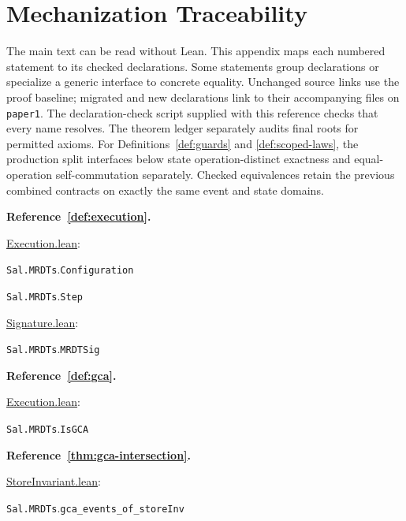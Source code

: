 \section{Mechanization Traceability}
\label{app:traceability}
The main text can be read without Lean. This appendix maps each numbered
statement to its checked declarations. Some statements group declarations
or specialize a generic interface to concrete equality. Unchanged source
links use the proof baseline; migrated and new declarations link to their
accompanying files on \texttt{paper1}. The declaration-check
script supplied with this reference checks that every name resolves.
The theorem ledger separately audits final roots for permitted axioms.
For Definitions~\ref{def:guards} and \ref{def:scoped-laws}, the
production split interfaces below state operation-distinct exactness and
equal-operation self-commutation separately. Checked equivalences retain
the previous combined contracts on exactly the same event and state domains.

\medskip\noindent\textbf{Reference~\ref{def:execution}.}\par\nobreak
\noindent\href{https://github.com/fplaunchpad/sal/blob/07fe525/Sal/MRDTs/Framework/Execution.lean}{Execution.lean}:\par
{\small\nolinkurl{Sal.MRDTs}.\allowbreak\nolinkurl{Configuration}}\par
{\small\nolinkurl{Sal.MRDTs}.\allowbreak\nolinkurl{Step}}\par
\noindent\href{https://github.com/fplaunchpad/sal/blob/07fe525/Sal/MRDTs/Framework/Signature.lean}{Signature.lean}:\par
{\small\nolinkurl{Sal.MRDTs}.\allowbreak\nolinkurl{MRDTSig}}\par

\medskip\noindent\textbf{Reference~\ref{def:gca}.}\par\nobreak
\noindent\href{https://github.com/fplaunchpad/sal/blob/07fe525/Sal/MRDTs/Framework/Execution.lean}{Execution.lean}:\par
{\small\nolinkurl{Sal.MRDTs}.\allowbreak\nolinkurl{IsGCA}}\par

\medskip\noindent\textbf{Reference~\ref{thm:gca-intersection}.}\par\nobreak
\noindent\href{https://github.com/fplaunchpad/sal/blob/07fe525/Sal/MRDTs/Metatheory/StoreInvariant.lean}{StoreInvariant.lean}:\par
{\small\nolinkurl{Sal.MRDTs}.\allowbreak\nolinkurl{gca_events_of_storeInv}}\par

